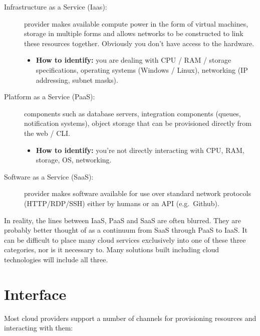 \begin{description}

\item[Infrastructure as a Service (Iaas):]
provider makes available compute power in the form of virtual machines,
storage in multiple forms and allows networks to be constructed to link
these resources together. Obviously you don't have access to the
hardware.

\begin{itemize}

\item
  \textbf{How to identify:} you are dealing with CPU / RAM / storage
  specifications, operating systems (Windows / Linux), networking (IP
  addressing, subnet masks).
\end{itemize}

\item[Platform as a Service (PaaS):]
components such as database servers, integration components (queues,
notification systems), object storage that can be provisioned directly
from the web / CLI.

\begin{itemize}
\item
  \textbf{How to identify:} you're not directly interacting with CPU,
  RAM, storage, OS, networking.
\end{itemize}

\item[Software as a Service (SaaS):]
provider makes software available for use over standard network
protocols (HTTP/RDP/SSH) either by humans or an API (e.g.~Github).
\end{description}

In reality, the lines between IaaS, PaaS and SaaS are often blurred.
They are probably better thought of as a continuum from SaaS through
PaaS to IaaS. It can be difficult to place many cloud services
exclusively into one of these three categories, nor is it necessary to.
Many solutions built including cloud technologies will include all
three.

\section{Interface}
\label{sec:interface}

Most cloud providers support a number of channels for provisioning
resources and interacting with them:

